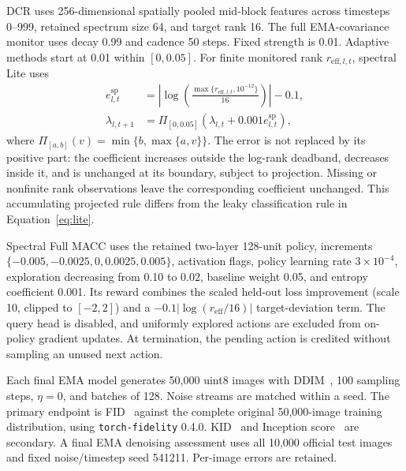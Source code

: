 \documentclass[a4paper,fleqn]{cas-dc}
\begin{document}
DCR uses 256-dimensional spatially pooled mid-block features
across timesteps 0--999, retained spectrum size 64,
and target rank 16.
The full EMA-covariance monitor uses decay 0.99 and cadence
50 steps. Fixed strength is 0.01.
Adaptive methods start at 0.01 within $[0,0.05]$.
For finite monitored rank $r_{\mathrm{eff},l,t}$, spectral Lite uses
\begin{align}
 e^{\mathrm{sp}}_{l,t}
 &=\left|\log\!\left(
 \frac{\max\{r_{\mathrm{eff},l,t},10^{-12}\}}{16}
 \right)\right|-0.1,\nonumber\\
 \lambda_{l,t+1}
 &=\Pi_{[0,0.05]}\!\left(\lambda_{l,t}
                +0.001e^{\mathrm{sp}}_{l,t}\right),
 \label{eq:spectral_lite_update}
\end{align}
where $\Pi_{[a,b]}(v)=\min\{b,\max\{a,v\}\}$.
The error is not replaced by its positive part: the coefficient
increases outside the log-rank deadband, decreases inside it, and
is unchanged at its boundary, subject to projection. Missing or
nonfinite rank observations leave the corresponding coefficient
unchanged. This accumulating projected rule differs from the leaky
classification rule in Equation~\eqref{eq:lite}.

Spectral Full MACC uses the retained two-layer 128-unit policy,
increments $\{-0.005,-0.0025,0,0.0025,0.005\}$,
activation flags, policy learning rate $3\times10^{-4}$,
exploration decreasing from 0.10 to 0.02, baseline weight 0.05,
and entropy coefficient 0.001.
Its reward combines the scaled held-out loss improvement
(scale 10, clipped to $[-2,2]$) and a
$-0.1|\log(r_{\mathrm{eff}}/16)|$ target-deviation term.
The query head is disabled, and uniformly explored actions
are excluded from on-policy gradient updates.
At termination, the pending action is credited without sampling
an unused next action.

Each final EMA model generates 50,000 uint8 images with
DDIM~\cite{song2021ddim}, 100 sampling steps, $\eta=0$,
and batches of 128. Noise streams are matched within a seed.
The primary endpoint is FID~\cite{heusel2017fid} against the
complete original 50,000-image training distribution, using
\texttt{torch-fidelity} 0.4.0.
KID~\cite{binkowski2018mmd} and Inception
score~\cite{salimans2016gan} are secondary.
A final EMA denoising assessment uses all 10,000 official test
images and fixed noise/timestep seed 541211.
Per-image errors are retained.
\end{document}
